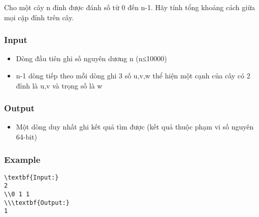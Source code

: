 



   Cho một cây n đỉnh được đánh số từ 0 đến n-1. Hãy tính tổng khoảng cách giữa mọi cặp đỉnh trên cây.  

\subsubsection{   Input  }
\begin{itemize}
	\item     Dòng đầu tiên ghi số nguyên dương n (n≤10000)   
	\item     n-1 dòng tiếp theo mỗi dòng ghi 3 số u,v,w thể hiện một cạnh của cây có 2 đỉnh là u,v và trọng số là w   
\end{itemize}

\subsubsection{   Output  }
\begin{itemize}
	\item     Một dòng duy nhất ghi kết quả tìm được (kết quả thuộc phạm vi số nguyên 64-bit)   
\end{itemize}

\subsubsection{   Example  }
\begin{verbatim}
\textbf{Input:}
2
\\0 1 1
\\\textbf{Output:}
1\end{verbatim}